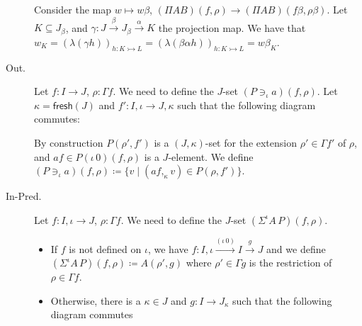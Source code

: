 \documentclass[english]{PaperTools/latex/lipics}
\newcommand\op[1]{∋_{#1}}
\newcommand\ip[3]{Σ^{#1} {#2}\,{#3}}
\def\fresh#1{\mathsf{fresh}(#1)}
\def\ie{\textit{i.e.}}
\begin{document}
\begin{description}
    Consider the map $w ↦ wβ$, $(Π A B)(f,ρ) → (Π A B)(fβ,ρβ)$.  Let
    $K ⊆ J_β$, and $γ : J \stackrel{β}{→} J_β \stackrel{α}{→} K$ the projection map.
    We have that
    $w_K = \left(λ(γh)\right)_{h : K ↣ L}
         = \left(λ(βαh)\right)_{h : K ↣ L}
         = wβ_K$.


  \item[\sc Out.]
    Let $f : I → J$, $ρ : Γf$.  We need to define the $J$-set $(P \op {ι} a)(f,ρ)$.
    Let $κ = \fresh J$ and $f' : I,ι → J,κ$ such that the following
    diagram commutes:


    By construction $P(ρ',f')$ is a $(J,κ)$-set for the extension $ρ' ∈ Γf'$ of $ρ$,
    and $af ∈ P(ι\,0)(f,ρ)$ is a $J$-element.
    We define $(P \op {ι} a)(f,ρ) ≔ \{ v \mid (af ,_κ v) ∈ P(ρ,f')\}$.

  \item[\sc In-Pred.]
    Let $f : I,ι → J$, $ρ : Γf$.  We need to define the $J$-set $(\ip {ι} A P)(f,ρ)$.

    \begin{itemize}
      \item If $f$ is not defined on $ι$, we have $f : I,ι \stackrel{(ι\,0)}{→} I \stackrel{g}{→} J$
        and we define $(\ip {ι} A P)(f,ρ) ≔ A(ρ',g)$
        where $ρ' ∈ Γg$ is the restriction of $ρ ∈ Γf$.

      \item Otherwise, there is a $κ ∈ J$ and $g : I → J_κ$ such that
        the following diagram commutes


\end{itemize}
\end{description}
\end{document}
